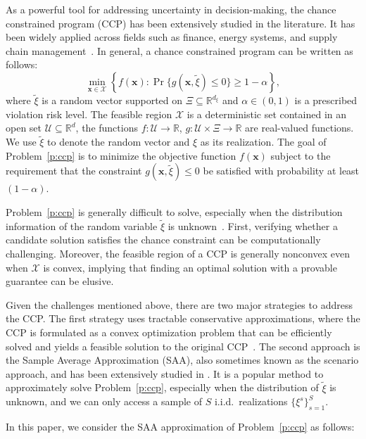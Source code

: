 \documentclass[11pt]{article}
\def\bs{\boldsymbol}
\def\Re{\mathbb{R}}
\def\txi{\tilde{\xi}}
\def\U{\mathcal{U}}
\def\X{\mathcal{X}}
\begin{document}
As a powerful tool for addressing uncertainty in decision-making, the chance constrained program (CCP) has been extensively studied in the literature. It has been widely applied across fields such as finance, energy systems, and supply chain management~\cite{ahmed2008solving,kuccukyavuz2022chance}. In general, a chance constrained program can be written as follows:
\begin{equation} \label{p:ccp}
\min_{\bs{x} \in \X} \left\{ f(\bs{x}): \Pr\{g(\bs{x}, \txi) \leq 0\} \geq 1-\alpha \right\}, 
\end{equation}
where $\txi$ is a random vector supported on $\Xi\subseteq\Re^{d_\xi}$ and $\alpha\in(0,1)$ is a prescribed violation risk level. The feasible region $\X$ is a deterministic set contained in an open set $\U\subseteq\Re^d$, the functions $f:\U\to\Re$, $g:\U\times\Xi \to \Re$ are real-valued functions. We use $\txi$ to denote the random vector and $\xi$ as its realization. The goal of Problem~\eqref{p:ccp} is to minimize the objective function $f(\bs{x})$ subject to the requirement that the constraint $g(\bs{x}, \txi) \leq 0$ be satisfied with probability at least $(1-\alpha)$. 

Problem~\eqref{p:ccp} is generally difficult to solve, especially when the distribution information of the random variable $\txi$ is unknown~\cite{ahmed2013probabilistic}. First, verifying whether a candidate solution satisfies the chance constraint can be computationally challenging. Moreover, the feasible region of a CCP is generally nonconvex even when $\X$ is convex, implying that finding an optimal solution with a provable guarantee can be elusive. 

Given the challenges mentioned above, there are two major strategies to address the CCP. The first strategy uses tractable conservative approximations, where the CCP is formulated as a convex optimization problem that can be efficiently solved and yields a feasible solution to the original CCP~\cite{rockafellar2002conditional, ahmed2018relaxations,cheung2012linear}. The second approach is the Sample Average Approximation (SAA), also sometimes known as the scenario approach, and has been extensively studied in \cite{ahmed2008solving, luedtke2008sample, nemirovski2007convex}. It is a popular method to approximately solve Problem~\eqref{p:ccp}, especially when the distribution of $\txi$ is unknown, and we can only access a sample of $S$ i.i.d.~realizations $\{\xi^s\}^S_{s=1}$. 

In this paper, we consider the SAA approximation of Problem~\eqref{p:ccp} as follows:
\end{document}
